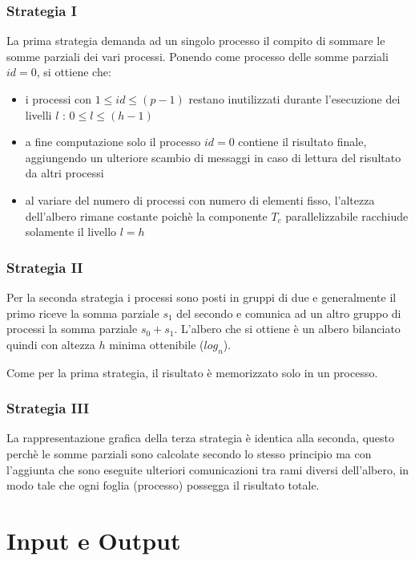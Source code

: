 \documentclass[a4paper,11pt]{book}
\begin{document}
\subsection{Strategia I}
La prima strategia demanda ad un singolo processo il compito di sommare le somme parziali dei vari processi. Ponendo come processo delle somme parziali $id = 0$, si ottiene che:
\begin{itemize}
    \item i processi con $1 \leq id \leq (p-1)$ restano inutilizzati durante l'esecuzione dei livelli $l$ : $ 0 \leq l \leq (h-1)$
    \item a fine computazione solo il processo $id = 0$ contiene il risultato finale, aggiungendo un ulteriore scambio di messaggi in caso di lettura del risultato da altri processi
    \item al variare del numero di processi con numero di elementi fisso, l'altezza dell'albero rimane costante poichè la componente $T_c$ parallelizzabile racchiude solamente il livello $l=h$
\end{itemize}

\subsection{Strategia II}
Per la seconda strategia i processi sono posti in gruppi di due e generalmente il primo riceve la somma parziale $s_1$ del secondo e comunica ad un altro gruppo di processi la somma parziale $s_0 + s_1$. L'albero che si ottiene è un albero bilanciato quindi con altezza $h$ minima ottenibile ($log_n$).\par 
Come per la prima strategia, il risultato è memorizzato solo in un processo.
\subsection{Strategia III}\label{strategia_3}
La rappresentazione grafica della terza strategia è identica alla seconda, questo perchè le somme parziali sono calcolate secondo lo stesso principio ma con l'aggiunta che sono eseguite ulteriori comunicazioni tra rami diversi dell'albero, in modo tale che ogni foglia (processo) possegga il risultato totale. 


\chapter{Input e Output}
\end{document}
